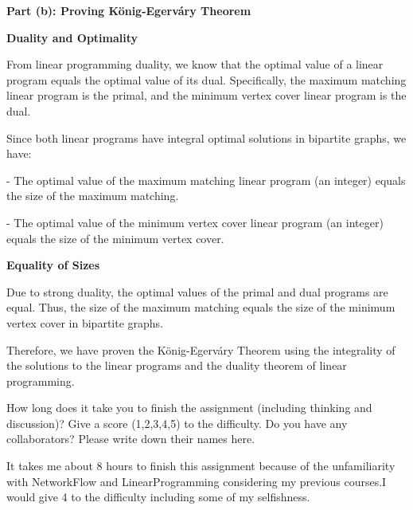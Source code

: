 \documentclass{oxmathproblems}
\begin{document}
\begin{questions}
\textbf{Part (b): Proving K\"{o}nig-Egerv\'{a}ry Theorem}

\textbf{Duality and Optimality}

From linear programming duality, we know that the optimal value of a linear program equals the optimal value of its dual. Specifically, the maximum matching linear program is the primal, and the minimum vertex cover linear program is the dual.

Since both linear programs have integral optimal solutions in bipartite graphs, we have:

- The optimal value of the maximum matching linear program (an integer) equals the size of the maximum matching.

- The optimal value of the minimum vertex cover linear program (an integer) equals the size of the minimum vertex cover.

\textbf{Equality of Sizes}

Due to strong duality, the optimal values of the primal and dual programs are equal. Thus, the size of the maximum matching equals the size of the minimum vertex cover in bipartite graphs.

Therefore, we have proven the K\"{o}nig-Egerv\'{a}ry Theorem using the integrality of the solutions to the linear programs and the duality theorem of linear programming.
  
\miquestion
How long does it take you to finish the assignment (including thinking and discussion)?
Give a score (1,2,3,4,5) to the difficulty.
Do you have any collaborators?
Please write down their names here.

It takes me about 8 hours to finish this assignment because of the unfamiliarity with NetworkFlow and LinearProgramming considering my previous courses.I would give 4 to the difficulty including some of my selfishness.

\end{questions}
\end{document}
